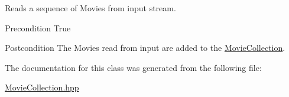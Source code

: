 Reads a sequence of Movies from input stream. 

\begin{DoxyPrecond}{Precondition}
True 
\end{DoxyPrecond}
\begin{DoxyPostcond}{Postcondition}
The Movies read from input are added to the \hyperlink{class_movie_collection}{Movie\-Collection}. 
\end{DoxyPostcond}


The documentation for this class was generated from the following file\-:\begin{DoxyCompactItemize}
\item 
\hyperlink{_movie_collection_8hpp}{Movie\-Collection.\-hpp}\end{DoxyCompactItemize}
